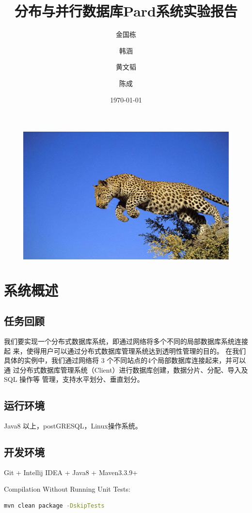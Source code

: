 \documentclass[a4paper, 12pt]{ctexart}
\author{金国栋\\
	\and
	韩涵\\
	\and
	黄文韬\\
	\and
	陈成\\
}
\title{分布与并行数据库Pard系统实验报告}
\date{\today}
\begin{document}
\maketitle%
\hspace{8em}
\begin{figure}[h]
	\centering
	\includegraphics[width=0.7\linewidth]{figure/leopard.png}
\end{figure}




\newpage
 
\tableofcontents
 
 
\section{系统概述}
\subsection{任务回顾}
我们要实现一个分布式数据库系统，即通过网络将多个不同的局部数据库系统连接起
来，使得用户可以通过分布式数据库管理系统达到透明性管理的目的。
在我们具体的实例中，我们通过网络将 3 个不同站点的4个局部数据库连接起来，并可以通
过分布式数据库管理系统（Client）进行数据库创建，数据分片、分配、导入及 SQL 操作等
管理，支持水平划分、垂直划分。


\subsection{运行环境}
Java8 以上，postGRESQL，Linux操作系统。

\subsection{开发环境}
Git + Intellij IDEA + Java8 + Maven3.3.9+

 
 Compilation Without Running Unit Tests:
 
\lstinline[language=bash]|mvn clean package -DskipTests|
\end{document}
